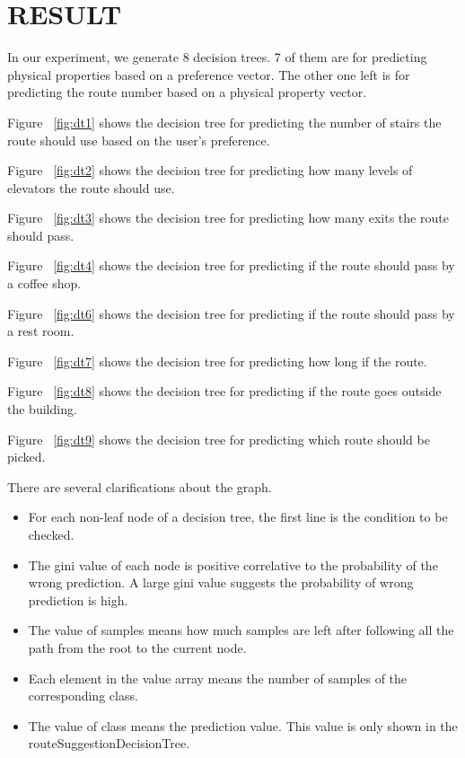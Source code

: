 \documentclass{sigchi}
\begin{document}
\section{RESULT}

In our experiment, we generate 8 decision trees. 7 of them are for predicting physical properties based on a preference vector. The other one left is for predicting the route number based on a physical property vector.

Figure ~\ref{fig:dt1} shows the decision tree for predicting the number of stairs the route should use based on the user’s preference. 

Figure ~\ref{fig:dt2} shows the decision tree for predicting how many levels of elevators the route should use. 

Figure ~\ref{fig:dt3} shows the decision tree for predicting how many exits the route should pass. 

Figure ~\ref{fig:dt4} shows the decision tree for predicting if the route should pass by a coffee shop. 

Figure ~\ref{fig:dt6} shows the decision tree for predicting if the route should pass by a rest room. 

Figure ~\ref{fig:dt7} shows the decision tree for predicting how long if the route. 

Figure ~\ref{fig:dt8} shows the decision tree for predicting if the route goes outside the building.


Figure ~\ref{fig:dt9} shows the decision tree for predicting which route should be picked.


There are several clarifications about the graph.
\begin{itemize}
\item For each non-leaf node of a decision tree, the first line is the condition to be checked. 
\item The gini value of each node is positive correlative to the probability of the wrong prediction. A large gini value suggests the probability of wrong prediction is high.
\item The value of samples means how much samples are left after following all the path from the root to the current node.
\item Each element in the value array means the number of samples of the corresponding class.
\item The value of class means the prediction value. This value is only shown in the routeSuggestionDecisionTree.
\end{itemize}
\end{document}
